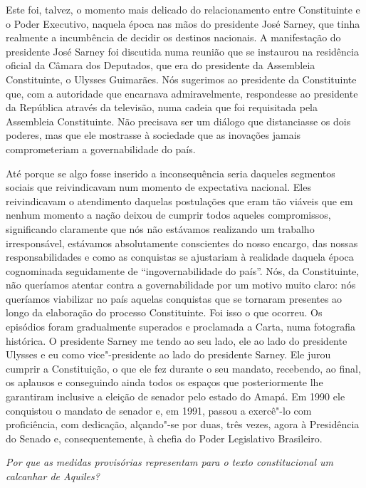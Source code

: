 Este foi, talvez, o momento mais delicado do
relacionamento entre Constituinte e o Poder Executivo, naquela época nas
mãos do presidente José Sarney, que tinha realmente a incumbência de
decidir os destinos nacionais. A manifestação do presidente José Sarney
foi discutida numa reunião que se instaurou na residência oficial da
Câmara dos Deputados, que era do presidente da Assembleia Constituinte,
o Ulysses Guimarães. Nós sugerimos ao presidente da Constituinte que,
com a autoridade que encarnava admiravelmente, respondesse ao presidente da
República através da televisão, numa cadeia que foi requisitada pela
Assembleia Constituinte. Não precisava ser um diálogo que distanciasse
os dois poderes, mas que ele mostrasse à sociedade que as inovações
jamais comprometeriam a governabilidade do país.

Até porque se algo fosse inserido a inconsequência seria daqueles
segmentos sociais que reivindicavam num momento de expectativa nacional.
Eles reivindicavam o atendimento daquelas postulações que eram tão
viáveis que em nenhum momento a nação deixou de cumprir todos aqueles
compromissos, significando claramente que nós não estávamos realizando
um trabalho irresponsável, estávamos absolutamente conscientes do nosso
encargo, das nossas responsabilidades e como as conquistas se ajustariam
à realidade daquela época cognominada seguidamente de
``ingovernabilidade do país''. Nós, da Constituinte, não queríamos
atentar contra a governabilidade por um motivo muito claro: nós
queríamos viabilizar no país aquelas conquistas que se tornaram
presentes ao longo da elaboração do processo Constituinte. Foi isso o
que ocorreu. Os episódios foram gradualmente superados e proclamada a
Carta, numa fotografia histórica. O presidente Sarney me tendo ao seu
lado, ele ao lado do presidente Ulysses e eu como vice"-presidente ao
lado do presidente Sarney. Ele jurou cumprir a Constituição, o que ele
fez durante o seu mandato, recebendo, ao final, os aplausos e
conseguindo ainda todos os espaços que posteriormente lhe garantiram
inclusive a eleição de senador pelo estado do Amapá. Em 1990 ele
conquistou o mandato de senador e, em 1991, passou a exercê"-lo com
proficiência, com dedicação, alçando"-se por duas, três vezes, agora à
Presidência do Senado e, consequentemente, à chefia do Poder Legislativo
Brasileiro.

\medskip

\noindent\emph{Por que as medidas provisórias representam para o texto
constitucional um calcanhar de Aquiles?}

